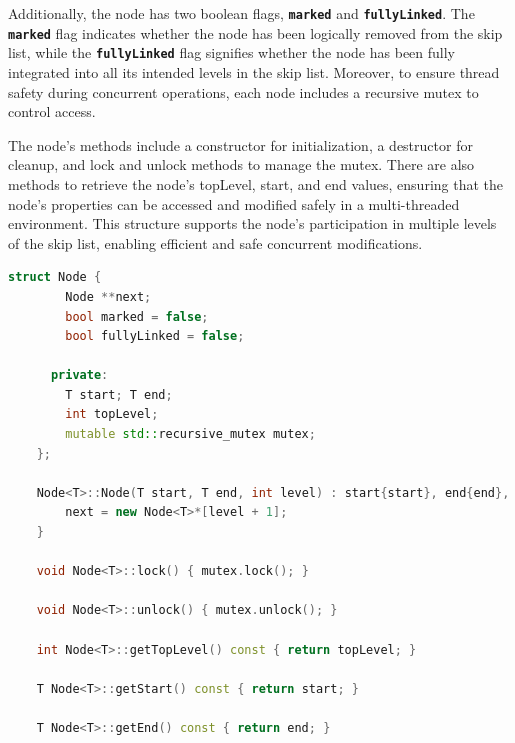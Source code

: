 Additionally, the node has two boolean flags, \textbf{\texttt{{marked}}} and \textbf{\texttt{{fullyLinked}}}. The \textbf{\texttt{{marked}}} flag indicates whether the node has been logically removed from the skip list, while the \texttt{\textbf{{fullyLinked}}} flag signifies whether the node has been fully integrated into all its intended levels in the skip list. Moreover, to ensure thread safety during concurrent operations, each node includes a recursive mutex  to control access. 

The node's methods include a constructor  for initialization, a destructor for cleanup, and lock and unlock methods to manage the mutex. There are also methods to retrieve the node's topLevel, start, and end values, ensuring that the node's properties can be accessed and modified safely in a multi-threaded environment. This structure supports the node's participation in multiple levels of the skip list, enabling efficient and safe concurrent modifications.

\begin{lstlisting}[language=C++, caption=Node structure]
    struct Node {
        Node **next;
        bool marked = false; 
        bool fullyLinked = false;

      private:
        T start; T end;
        int topLevel;
        mutable std::recursive_mutex mutex;
    };

    Node<T>::Node(T start, T end, int level) : start{start}, end{end}, topLevel{level} {
        next = new Node<T>*[level + 1];
    }

    void Node<T>::lock() { mutex.lock(); }

    void Node<T>::unlock() { mutex.unlock(); }

    int Node<T>::getTopLevel() const { return topLevel; }

    T Node<T>::getStart() const { return start; }

    T Node<T>::getEnd() const { return end; }
\end{lstlisting}